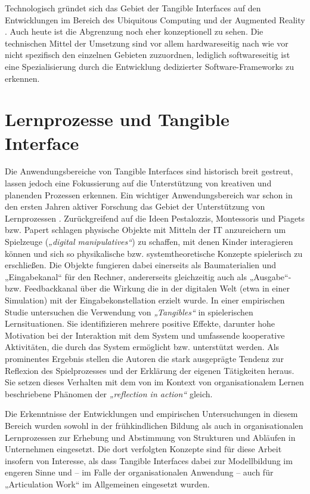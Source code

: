 Technologisch gründet sich das Gebiet der Tangible Interfaces auf den Entwicklungen im Bereich des Ubiquitous Computing \citep{Weiser91} und der Augmented Reality \citep{Azuma97}. Auch heute ist die Abgrenzung noch eher konzeptionell zu sehen. Die technischen Mittel der Umsetzung sind vor allem hardwareseitig nach wie vor nicht spezifisch den einzelnen Gebieten zuzuordnen, lediglich softwareseitig ist eine Spezialisierung durch die Entwicklung dedizierter Software-Frameworks zu erkennen.

\section{Lernprozesse und Tangible Interface} %
\label{sec:lernprozesse_und_tangible_interface}

Die Anwendungsbereiche von Tangible Interfaces sind historisch breit gestreut, lassen jedoch eine Fokussierung auf die Unterstützung von kreativen und planenden Prozessen erkennen. Ein wichtiger Anwendungsbereich war schon in den ersten Jahren aktiver Forschung das Gebiet der Unterstützung von Lernprozessen \citep{Resnick98}. Zurückgreifend auf die Ideen Pestalozzis, Montessoris \citep{Montessori05} und Piagets \citep{Piaget76} bzw. Papert \citep{Papert00} schlagen \citet{Resnick98} physische Objekte mit Mitteln der IT anzureichern um Spielzeuge (\emph{„digital manipulatives“}) zu schaffen, mit denen Kinder interagieren können und sich so physikalische bzw. systemtheoretische Konzepte spielerisch zu erschließen. Die Objekte fungieren dabei einerseits als Baumaterialien und „Eingabekanal“ für den Rechner, andererseits gleichzeitig auch als „Ausgabe“- bzw. Feedbackkanal über die Wirkung die in der digitalen Welt (etwa in einer Simulation) mit der Eingabekonstellation erzielt wurde. In einer empirischen Studie untersuchen \citet{Price03} die Verwendung von \emph{„Tangibles“} in spielerischen Lernsituationen. Sie identifizieren mehrere positive Effekte, darunter hohe Motivation bei der Interaktion mit dem System und umfassende kooperative Aktivitäten, die durch das System ermöglicht bzw. unterstützt werden. Als prominentes Ergebnis stellen die Autoren die stark ausgeprägte Tendenz zur Reflexion des Spielprozesses und der Erklärung der eigenen Tätigkeiten heraus. Sie setzen dieses Verhalten mit dem von \citet{Schon84} im Kontext von organisationalem Lernen beschriebene Phänomen der \emph{„reflection in action“} gleich. 

Die Erkenntnisse der Entwicklungen und empirischen Untersuchungen in diesem Bereich wurden sowohl in der frühkindlichen Bildung \citep{Zuckerman05} als auch in organisationalen Lernprozessen zur Erhebung und Abstimmung von Strukturen und Abläufen in Unternehmen \citep{Lego02} eingesetzt. Die dort verfolgten Konzepte sind für diese Arbeit insofern von Interesse, als dass Tangible Interfaces dabei zur Modellbildung im engeren Sinne und -- im Falle der organisationalen Anwendung -- auch für „Articulation Work“ im Allgemeinen eingesetzt wurden.

